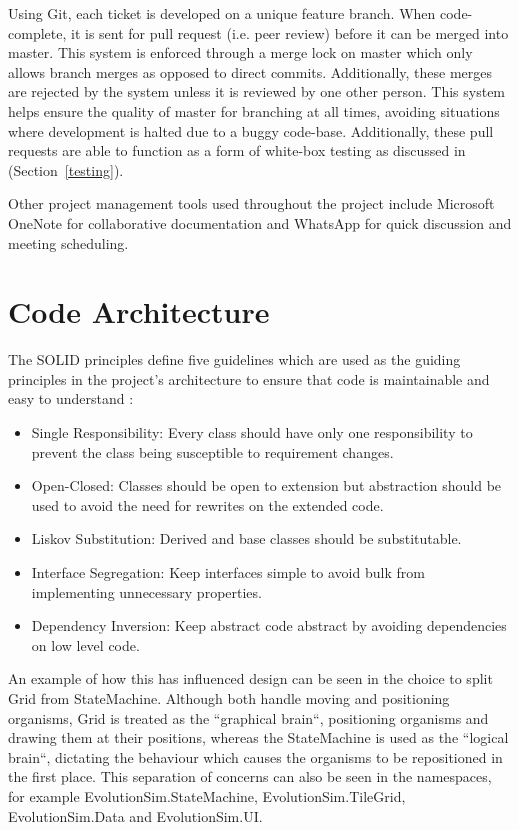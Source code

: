 \documentclass[a4paper, oneside, 11pt]{report}
\begin{document}
Using Git, each ticket is developed on a unique feature branch. When code-complete, it is sent for pull request (i.e. peer review) before it can be merged into master. This system is enforced through a merge lock on master which only allows branch merges as opposed to direct commits. Additionally, these merges are rejected by the system unless it is reviewed by one other person. This system helps ensure the quality of master for branching at all times, avoiding situations where development is halted due to a buggy code-base. Additionally, these pull requests are able to function as a form of white-box testing as discussed in (Section~\ref{testing}).

Other project management tools used throughout the project include Microsoft OneNote for collaborative documentation and WhatsApp for quick discussion and meeting scheduling.

\section{Code Architecture}\label{architecture}
The SOLID principles define five guidelines which are used as the guiding principles in the project's architecture to ensure that code is maintainable and easy to understand \cite{kelmendi}:
\begin{itemize}
	\item Single Responsibility: Every class should have only one responsibility to prevent the class being susceptible to requirement changes.
	\item Open-Closed: Classes should be open to extension but abstraction should be used to avoid the need for rewrites on the extended code.
	\item Liskov Substitution: Derived and base classes should be substitutable.
	\item Interface Segregation: Keep interfaces simple to avoid bulk from implementing unnecessary properties.
	\item Dependency Inversion: Keep abstract code abstract by avoiding dependencies on low level code.
\end{itemize}

An example of how this has influenced design can be seen in the choice to split Grid from StateMachine. Although both handle moving and positioning organisms, Grid is treated as the ``graphical brain``, positioning organisms and drawing them at their positions, whereas the StateMachine is used as the ``logical brain``, dictating the behaviour which causes the organisms to be repositioned in the first place. This separation of concerns can also be seen in the namespaces, for example EvolutionSim.StateMachine, EvolutionSim.TileGrid, EvolutionSim.Data and EvolutionSim.UI.
\end{document}
